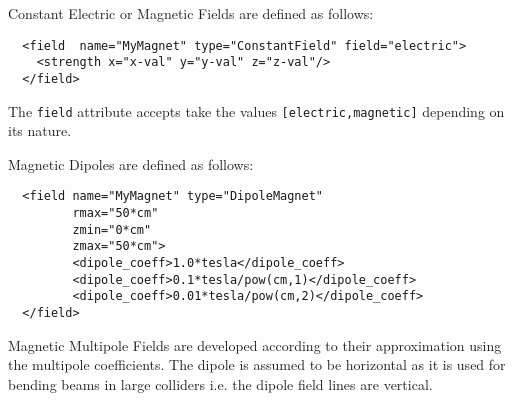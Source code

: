 Constant Electric or Magnetic Fields are defined as follows:
\begin{verbatim}
  <field  name="MyMagnet" type="ConstantField" field="electric">
    <strength x="x-val" y="y-val" z="z-val"/>
  </field>
\end{verbatim}
The {\texttt{field}} attribute accepts take the values {\texttt{[electric,magnetic]}} depending on its nature.

Magnetic Dipoles are defined as follows:
\begin{verbatim}
  <field name="MyMagnet" type="DipoleMagnet"
         rmax="50*cm"
         zmin="0*cm"
         zmax="50*cm">
         <dipole_coeff>1.0*tesla</dipole_coeff>
         <dipole_coeff>0.1*tesla/pow(cm,1)</dipole_coeff>
         <dipole_coeff>0.01*tesla/pow(cm,2)</dipole_coeff>
  </field>
\end{verbatim}

Magnetic Multipole Fields are developed according to their  approximation using the multipole coefficients. The dipole is assumed to be horizontal as it is used for bending beams in large colliders
i.e. the dipole field lines are vertical.

